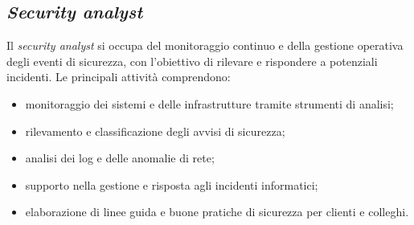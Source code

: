 \subsection{\textit{Security analyst}}
Il \textit{security analyst} si occupa del monitoraggio continuo e della gestione operativa degli eventi di sicurezza, con l'obiettivo di rilevare e rispondere a potenziali incidenti.  
Le principali attività comprendono:
\begin{itemize}
    \item monitoraggio dei sistemi e delle infrastrutture tramite strumenti di analisi;
    \item rilevamento e classificazione degli avvisi di sicurezza;
    \item analisi dei log e delle anomalie di rete;
    \item supporto nella gestione e risposta agli incidenti informatici;
    \item elaborazione di linee guida e buone pratiche di sicurezza per clienti e colleghi.
\end{itemize}
